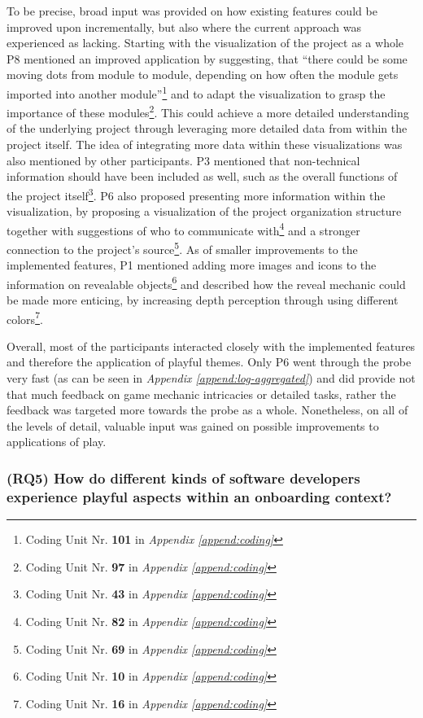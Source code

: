 To be precise, broad input was provided on how existing features could be improved upon incrementally, but also where the current approach was experienced as lacking. Starting with the visualization of the project as a whole P8 mentioned an improved application by suggesting, that \enquote{there could be some moving dots from module to module, depending on how often the module gets imported into another module}\footnote{Coding Unit Nr. \textbf{101} in \textit{Appendix \ref{append:coding}}} and to adapt the visualization to grasp the importance of these modules\footnote{Coding Unit Nr. \textbf{97} in \textit{Appendix \ref{append:coding}}}. This could achieve a more detailed understanding of the underlying project through leveraging more detailed data from within the project itself. The idea of integrating more data within these visualizations was also mentioned by other participants. P3 mentioned that non-technical information should have been included as well, such as the overall functions of the project itself\footnote{Coding Unit Nr. \textbf{43} in \textit{Appendix \ref{append:coding}}}. P6 also proposed presenting more information within the visualization, by proposing a visualization of the project organization structure together with suggestions of who to communicate with\footnote{Coding Unit Nr. \textbf{82} in \textit{Appendix \ref{append:coding}}} and a stronger connection to the project's source\footnote{Coding Unit Nr. \textbf{69} in \textit{Appendix \ref{append:coding}}}. As of smaller improvements to the implemented features, P1 mentioned adding more images and icons to the information on revealable objects\footnote{Coding Unit Nr. \textbf{10} in \textit{Appendix \ref{append:coding}}} and described how the reveal mechanic could be made more enticing, by increasing depth perception through using different colors\footnote{Coding Unit Nr. \textbf{16} in \textit{Appendix \ref{append:coding}}}.

Overall, most of the participants interacted closely with the implemented features and therefore the application of playful themes. Only P6 went through the probe very fast (as can be seen in \textit{Appendix \ref{append:log-aggregated}}) and did provide not that much feedback on game mechanic intricacies or detailed tasks, rather the feedback was targeted more towards the probe as a whole. Nonetheless, on all of the levels of detail, valuable input was gained on possible improvements to applications of play.

\subsubsection*{(RQ5) How do different kinds of software developers experience playful aspects within an onboarding context?}

